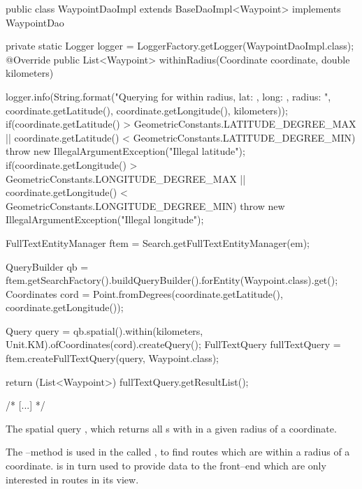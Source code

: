 \begin{listing}
    \begin{java2}
public class WaypointDaoImpl extends BaseDaoImpl<Waypoint> implements WaypointDao {
    private static Logger logger = LoggerFactory.getLogger(WaypointDaoImpl.class);
    @Override
    public List<Waypoint> withinRadius(Coordinate coordinate, double kilometers) {
        logger.info(String.format("Querying for within radius, lat: {}, long: {}, radius: {}",
            coordinate.getLatitude(), coordinate.getLongitude(), kilometers));
        if(coordinate.getLatitude() > GeometricConstants.LATITUDE_DEGREE_MAX ||
            coordinate.getLatitude() < GeometricConstants.LATITUDE_DEGREE_MIN)
            throw new IllegalArgumentException("Illegal latitude");
        if(coordinate.getLongitude() > GeometricConstants.LONGITUDE_DEGREE_MAX ||
            coordinate.getLongitude() < GeometricConstants.LONGITUDE_DEGREE_MIN)
            throw new IllegalArgumentException("Illegal longitude");

        FullTextEntityManager ftem = Search.getFullTextEntityManager(em);

        QueryBuilder qb = ftem.getSearchFactory().buildQueryBuilder().forEntity(Waypoint.class).get();
        Coordinates cord = Point.fromDegrees(coordinate.getLatitude(), coordinate.getLongitude());

        Query query = qb.spatial().within(kilometers, Unit.KM).ofCoordinates(cord).createQuery();
        FullTextQuery fullTextQuery = ftem.createFullTextQuery(query, Waypoint.class);

        return (List<Waypoint>) fullTextQuery.getResultList();
    }
    /* [...] */
}
    \end{java2}
    \caption{The spatial query , which returns all s with in a given radius of a coordinate.}\label{lst:withinRadius}
\end{listing}
The --method is used in the  called , to find routes which are within a radius of a coordinate.
 is in turn used to provide data to the front--end which are only interested in routes in its view.
